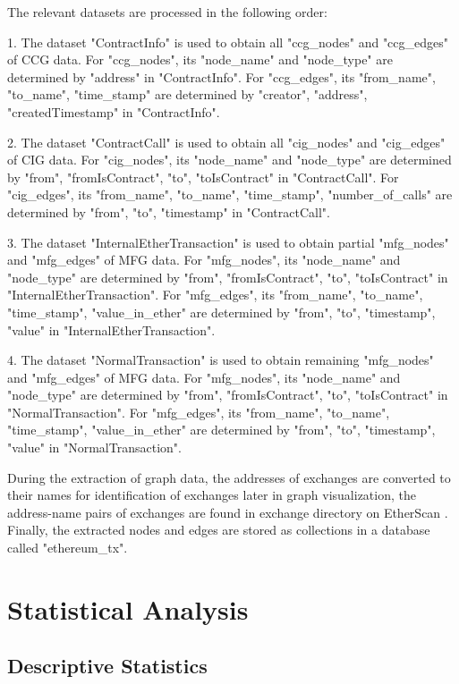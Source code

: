 The relevant datasets are processed in the following order:

1. The dataset "ContractInfo" is used to obtain all "ccg\_nodes" and "ccg\_edges" of CCG data. For "ccg\_nodes", its "node\_name" and "node\_type" are determined by "address" in "ContractInfo". For "ccg\_edges", its "from\_name", "to\_name", "time\_stamp" are determined by "creator", "address", "createdTimestamp" in "ContractInfo".

2. The dataset "ContractCall" is used to obtain all "cig\_nodes" and "cig\_edges" of CIG data. For "cig\_nodes", its "node\_name" and "node\_type" are determined by "from", "fromIsContract", "to", "toIsContract" in "ContractCall". For "cig\_edges", its "from\_name", "to\_name", "time\_stamp", "number\_of\_calls" are determined by "from", "to", "timestamp" in "ContractCall".

3. The dataset "InternalEtherTransaction" is used to obtain partial "mfg\_nodes" and "mfg\_edges" of MFG data. For "mfg\_nodes", its "node\_name" and "node\_type" are determined by "from", "fromIsContract", "to", "toIsContract" in "InternalEtherTransaction". For "mfg\_edges", its "from\_name", "to\_name", "time\_stamp", "value\_in\_ether" are determined by "from", "to", "timestamp", "value" in "InternalEtherTransaction".

4. The dataset "NormalTransaction" is used to obtain remaining "mfg\_nodes" and "mfg\_edges" of MFG data. For "mfg\_nodes", its "node\_name" and "node\_type" are determined by "from", "fromIsContract", "to", "toIsContract" in "NormalTransaction". For "mfg\_edges", its "from\_name", "to\_name", "time\_stamp", "value\_in\_ether" are determined by "from", "to", "timestamp", "value" in "NormalTransaction".

During the extraction of graph data, the addresses of exchanges are converted to their names for identification of exchanges later in graph visualization, the address-name pairs of exchanges are found in exchange directory on EtherScan \cite{17}. Finally, the extracted nodes and edges are stored as collections in a database called "ethereum\_tx".

\section{Statistical Analysis}
\label{sec:methodology:analysis}

\subsection{Descriptive Statistics}
\label{sec:methodology:analysis:statistics}

